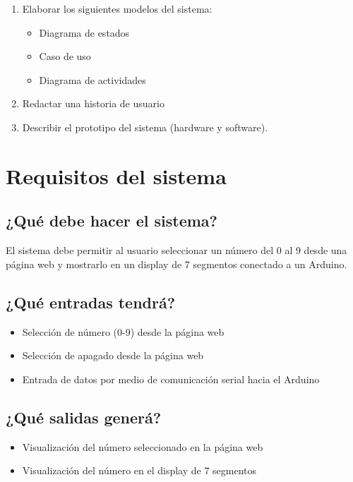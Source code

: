 \documentclass{article}
\begin{document}
\begin{enumerate}
\begin{itemize}
            \end{itemize}
        \item Elaborar los siguientes modelos del sistema:
            \begin{itemize}
                \item Diagrama de estados
                \item Caso de uso
                \item Diagrama de actividades
            \end{itemize}
        \item Redactar una historia de usuario
        \item Describir el prototipo del sistema (hardware y software).
    \end{enumerate}

\section{Requisitos del sistema}
    \subsection{¿Qué debe hacer el sistema?}
        El sistema debe permitir al usuario seleccionar un número del 0 al 9 desde una página web y mostrarlo en un display de 7 segmentos conectado a un Arduino.

    \subsection{¿Qué entradas tendrá?}
        \begin{itemize}
            \item Selección de número (0-9) desde la página web
            \item Selección de apagado desde la página web
            \item Entrada de datos por medio de comunicación serial hacia el Arduino
        \end{itemize}
        
    \subsection{¿Qué salidas generá?}
        \begin{itemize}
            \item Visualización del número seleccionado en la página web
            \item Visualización del número en el display de 7 segmentos
        \end{itemize}
\end{document}
